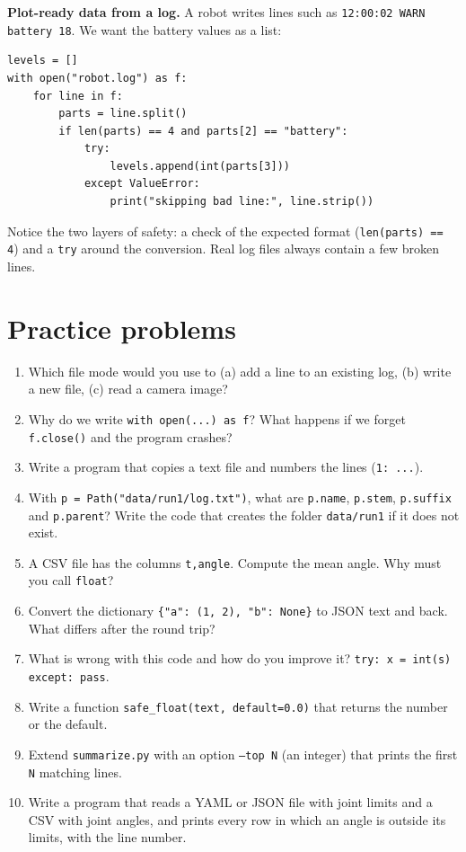 \begin{example}
\textbf{Plot-ready data from a log.} A robot writes lines such as \texttt{12:00:02 WARN battery 18}. We want the battery values as a list:
\begin{verbatim}
levels = []
with open("robot.log") as f:
    for line in f:
        parts = line.split()
        if len(parts) == 4 and parts[2] == "battery":
            try:
                levels.append(int(parts[3]))
            except ValueError:
                print("skipping bad line:", line.strip())
\end{verbatim}
Notice the two layers of safety: a check of the expected format (\texttt{len(parts) == 4}) and a \texttt{try} around the conversion. Real log files always contain a few broken lines.
\end{example}

\section*{Practice problems}
\begin{enumerate}[label=\textbf{\thechapter.\arabic*}]
  \item Which file mode would you use to (a) add a line to an existing log, (b) write a new file, (c) read a camera image?
  \item Why do we write \texttt{with open(...) as f}? What happens if we forget \texttt{f.close()} and the program crashes?
  \item Write a program that copies a text file and numbers the lines (\texttt{1: ...}).
  \item With \texttt{p = Path("data/run1/log.txt")}, what are \texttt{p.name}, \texttt{p.stem}, \texttt{p.suffix} and \texttt{p.parent}? Write the code that creates the folder \texttt{data/run1} if it does not exist.
  \item A CSV file has the columns \texttt{t,angle}. Compute the mean angle. Why must you call \texttt{float}?
  \item Convert the dictionary \verb!{"a": (1, 2), "b": None}! to JSON text and back. What differs after the round trip?
  \item What is wrong with this code and how do you improve it? \verb!try: x = int(s)! \texttt{except: pass}.
  \item Write a function \texttt{safe\_float(text, default=0.0)} that returns the number or the default.
  \item Extend \texttt{summarize.py} with an option \texttt{--top N} (an integer) that prints the first \texttt{N} matching lines.
  \item[\textbf{\thechapter.10}$\star$] Write a program that reads a YAML or JSON file with joint limits and a CSV with joint angles, and prints every row in which an angle is outside its limits, with the line number.
\end{enumerate}
